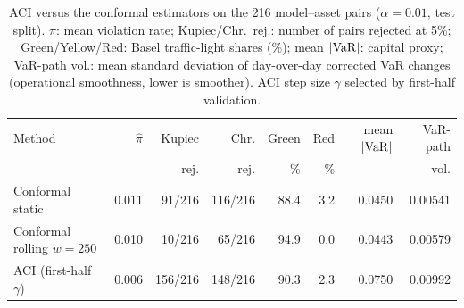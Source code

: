 \begin{table}[htbp]
	\centering
	\caption{ACI versus the conformal estimators on the 216 model--asset pairs ($\alpha = 0.01$, test split). $\hat\pi$: mean violation rate; Kupiec/Chr.\ rej.: number of pairs rejected at 5\%; Green/Yellow/Red: Basel traffic-light shares (\%); mean $|\mathrm{VaR}|$: capital proxy; VaR-path vol.: mean standard deviation of day-over-day corrected VaR changes (operational smoothness, lower is smoother). ACI step size $\gamma$ selected by first-half validation.}
	\label{tab:baselines_aci}
	\footnotesize
	\begin{tabular}{@{}lrrrrrrr@{}}
		\hline\hline
		Method & $\hat\pi$ & Kupiec & Chr. & Green & Red & mean $|\mathrm{VaR}|$ & VaR-path \\
		 & & rej. & rej. & \% & \% & & vol. \\
		\hline
		Conformal static & 0.011 & 91/216 & 116/216 & 88.4 & 3.2 & 0.0450 & 0.00541 \\
		Conformal rolling $w{=}250$ & 0.010 & 10/216 & 65/216 & 94.9 & 0.0 & 0.0443 & 0.00579 \\
		ACI (first-half $\gamma$) & 0.006 & 156/216 & 148/216 & 90.3 & 2.3 & 0.0750 & 0.00992 \\
		\hline\hline
	\end{tabular}
\end{table}
